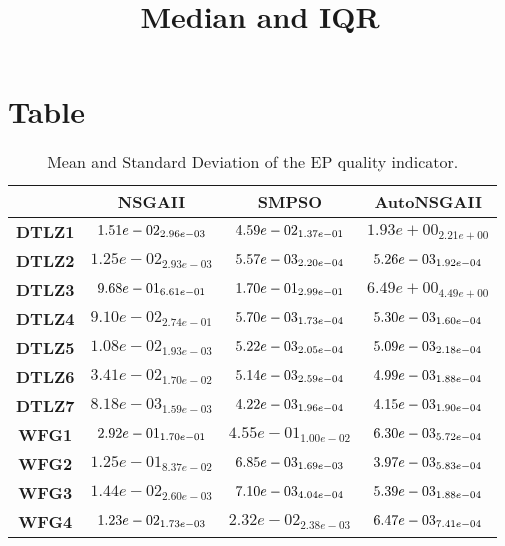 \documentclass{article}
\title{Median and IQR}
\author{}
\begin{document}
\maketitle
\section{Table}
\begin{table}[!htp]
  \caption{Mean and Standard Deviation of the EP quality indicator.}
  \label{table:EP}
  \centering
  \begin{scriptsize}
  \begin{tabular}{c|ccc}
      & \textbf{NSGAII} & \textbf{SMPSO} & \textbf{AutoNSGAII} \\\hline
      \textbf{DTLZ1} & $\cellcolor{gray95} 1.51e-02_{2.96e-03} $ & $ \cellcolor{gray25} 4.59e-02_{1.37e-01} $ & $ 1.93e+00_{2.21e+00}$ \\
      \textbf{DTLZ2} & $1.25e-02_{2.93e-03} $ & $ \cellcolor{gray25} 5.57e-03_{2.20e-04} $ & $ \cellcolor{gray95} 5.26e-03_{1.92e-04}$ \\
      \textbf{DTLZ3} & $\cellcolor{gray25} 9.68e-01_{6.61e-01} $ & $ \cellcolor{gray95} 1.70e-01_{2.99e-01} $ & $ 6.49e+00_{4.49e+00}$ \\
      \textbf{DTLZ4} & $9.10e-02_{2.74e-01} $ & $ \cellcolor{gray25} 5.70e-03_{1.73e-04} $ & $ \cellcolor{gray95} 5.30e-03_{1.60e-04}$ \\
      \textbf{DTLZ5} & $1.08e-02_{1.93e-03} $ & $ \cellcolor{gray25} 5.22e-03_{2.05e-04} $ & $ \cellcolor{gray95} 5.09e-03_{2.18e-04}$ \\
      \textbf{DTLZ6} & $3.41e-02_{1.70e-02} $ & $ \cellcolor{gray25} 5.14e-03_{2.59e-04} $ & $ \cellcolor{gray95} 4.99e-03_{1.88e-04}$ \\
      \textbf{DTLZ7} & $8.18e-03_{1.59e-03} $ & $ \cellcolor{gray25} 4.22e-03_{1.96e-04} $ & $ \cellcolor{gray95} 4.15e-03_{1.90e-04}$ \\
      \textbf{WFG1} & $\cellcolor{gray25} 2.92e-01_{1.70e-01} $ & $ 4.55e-01_{1.00e-02} $ & $ \cellcolor{gray95} 6.30e-03_{5.72e-04}$ \\
      \textbf{WFG2} & $1.25e-01_{8.37e-02} $ & $ \cellcolor{gray25} 6.85e-03_{1.69e-03} $ & $ \cellcolor{gray95} 3.97e-03_{5.83e-04}$ \\
      \textbf{WFG3} & $1.44e-02_{2.60e-03} $ & $ \cellcolor{gray25} 7.10e-03_{4.04e-04} $ & $ \cellcolor{gray95} 5.39e-03_{1.88e-04}$ \\
      \textbf{WFG4} & $\cellcolor{gray25} 1.23e-02_{1.73e-03} $ & $ 2.32e-02_{2.38e-03} $ & $ \cellcolor{gray95} 6.47e-03_{7.41e-04}$ \\

\end{tabular}
\end{scriptsize}
\end{table}
\end{document}
